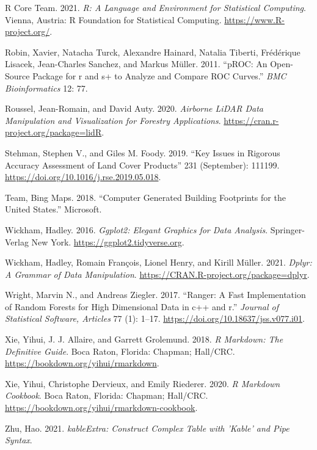 \documentclass[review]{elsarticle} %
\newlength{\cslhangindent}
\newenvironment{CSLReferences}[2] %
 {%
  \setlength{\parindent}{0pt}
  \ifodd #1 \everypar{\setlength{\hangindent}{\cslhangindent}}\ignorespaces\fi
  \ifnum #2 > 0
  \setlength{\parskip}{#2\baselineskip}
  \fi
 }%
 {}
\begin{document}
\begin{CSLReferences}{1}{0}
\leavevmode{}%
R Core Team. 2021. \emph{R: A Language and Environment for Statistical Computing}. Vienna, Austria: R Foundation for Statistical Computing. \url{https://www.R-project.org/}.

\leavevmode{}%
Robin, Xavier, Natacha Turck, Alexandre Hainard, Natalia Tiberti, Frédérique Lisacek, Jean-Charles Sanchez, and Markus Müller. 2011. {``pROC: An Open-Source Package for r and s+ to Analyze and Compare ROC Curves.''} \emph{BMC Bioinformatics} 12: 77.

\leavevmode{}%
Roussel, Jean-Romain, and David Auty. 2020. \emph{Airborne LiDAR Data Manipulation and Visualization for Forestry Applications}. \url{https://cran.r-project.org/package=lidR}.

\leavevmode{}%
Stehman, Stephen V., and Giles M. Foody. 2019. {``Key Issues in Rigorous Accuracy Assessment of Land Cover Products''} 231 (September): 111199. \url{https://doi.org/10.1016/j.rse.2019.05.018}.

\leavevmode{}%
Team, Bing Maps. 2018. {``{Computer Generated Building Footprints for the United States.}''} Microsoft.

\leavevmode{}%
Wickham, Hadley. 2016. \emph{Ggplot2: Elegant Graphics for Data Analysis}. Springer-Verlag New York. \url{https://ggplot2.tidyverse.org}.

\leavevmode{}%
Wickham, Hadley, Romain François, Lionel Henry, and Kirill Müller. 2021. \emph{Dplyr: A Grammar of Data Manipulation}. \url{https://CRAN.R-project.org/package=dplyr}.

\leavevmode{}%
Wright, Marvin N., and Andreas Ziegler. 2017. {``Ranger: A Fast Implementation of Random Forests for High Dimensional Data in c++ and r.''} \emph{Journal of Statistical Software, Articles} 77 (1): 1--17. \url{https://doi.org/10.18637/jss.v077.i01}.

\leavevmode{}%
Xie, Yihui, J. J. Allaire, and Garrett Grolemund. 2018. \emph{R Markdown: The Definitive Guide}. Boca Raton, Florida: Chapman; Hall/CRC. \url{https://bookdown.org/yihui/rmarkdown}.

\leavevmode{}%
Xie, Yihui, Christophe Dervieux, and Emily Riederer. 2020. \emph{R Markdown Cookbook}. Boca Raton, Florida: Chapman; Hall/CRC. \url{https://bookdown.org/yihui/rmarkdown-cookbook}.

\leavevmode{}%
Zhu, Hao. 2021. \emph{kableExtra: Construct Complex Table with 'Kable' and Pipe Syntax}.

\end{CSLReferences}
\end{document}
